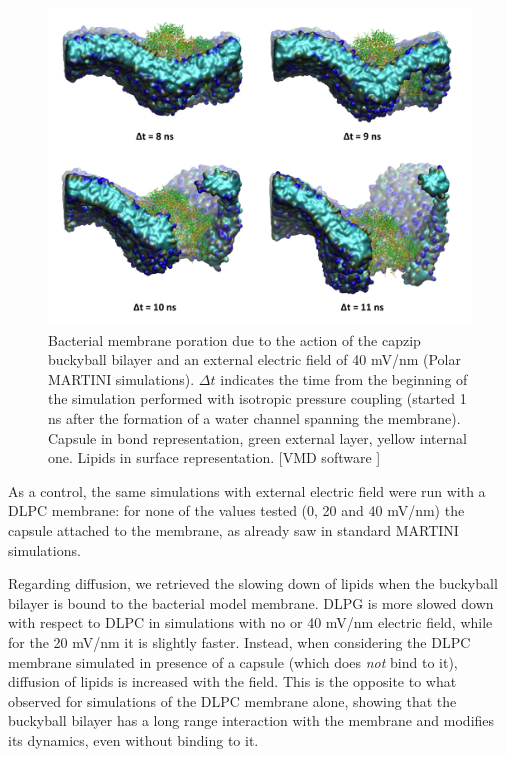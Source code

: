 \begin{figure}[t!]
\centering\includegraphics[width=0.95\linewidth]{3results_capsule/pics/poration_martini.png} 
\caption[Bacterial membrane poration (MARTINI simulations)]{Bacterial membrane poration due to the action of the capzip buckyball bilayer and an external electric field of 40 mV/nm (Polar MARTINI simulations). $\Delta t$ indicates the time from the beginning of the simulation performed with isotropic pressure coupling (started 1 ns after the formation of a water channel spanning the membrane). Capsule in bond representation, green external layer, yellow internal one. Lipids in surface representation. [VMD software \citet{HUMP96}]}
\label{fig:martini_poration}
\end{figure}

As a control, the same simulations with external electric field were run with a DLPC membrane: for none of the values tested (0, 20 and 40 mV/nm) the capsule attached to the membrane, as already saw in standard MARTINI simulations.
%

Regarding diffusion, we retrieved the slowing down of lipids when the buckyball bilayer is bound to the bacterial model membrane. DLPG is more slowed down with respect to DLPC in simulations with no or 40 mV/nm electric field, while for the 20 mV/nm it is slightly faster.
%
Instead, when considering the DLPC membrane simulated in presence of a capsule (which does \emph{not} bind to it), diffusion of lipids is increased with the field. This is the opposite to what observed for simulations of the DLPC membrane alone, showing that the buckyball bilayer has a long range interaction with the membrane and modifies its dynamics, even without binding to it. 

